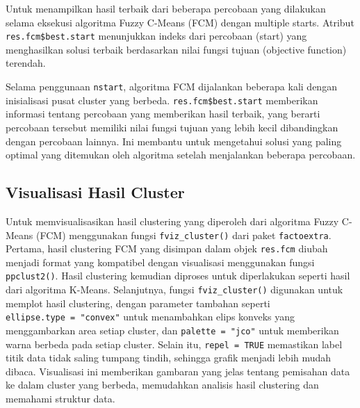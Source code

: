 \documentclass[
  oneside]{book}
\newenvironment{Shaded}{\begin{snugshade}}{\end{snugshade}}
\newcommand{\CommentTok}[1]{\textcolor[rgb]{0.56,0.35,0.01}{\textit{#1}}}
\newcommand{\NormalTok}[1]{#1}
\newcommand{\SpecialCharTok}[1]{\textcolor[rgb]{0.81,0.36,0.00}{\textbf{#1}}}
\begin{document}
Untuk menampilkan hasil terbaik dari beberapa percobaan yang dilakukan selama eksekusi algoritma Fuzzy C-Means (FCM) dengan multiple starts. Atribut \texttt{res.fcm\$best.start} menunjukkan indeks dari percobaan (start) yang menghasilkan solusi terbaik berdasarkan nilai fungsi tujuan (objective function) terendah.

Selama penggunaan \texttt{nstart}, algoritma FCM dijalankan beberapa kali dengan inisialisasi pusat cluster yang berbeda. \texttt{res.fcm\$best.start} memberikan informasi tentang percobaan yang memberikan hasil terbaik, yang berarti percobaan tersebut memiliki nilai fungsi tujuan yang lebih kecil dibandingkan dengan percobaan lainnya. Ini membantu untuk mengetahui solusi yang paling optimal yang ditemukan oleh algoritma setelah menjalankan beberapa percobaan.

\begin{Shaded}
\end{Shaded}

\subsection*{Visualisasi Hasil Cluster}\label{visualisasi-hasil-cluster-1}

Untuk memvisualisasikan hasil clustering yang diperoleh dari algoritma Fuzzy C-Means (FCM) menggunakan fungsi \texttt{fviz\_cluster()} dari paket \texttt{factoextra}. Pertama, hasil clustering FCM yang disimpan dalam objek \texttt{res.fcm} diubah menjadi format yang kompatibel dengan visualisasi menggunakan fungsi \texttt{ppclust2()}. Hasil clustering kemudian diproses untuk diperlakukan seperti hasil dari algoritma K-Means. Selanjutnya, fungsi \texttt{fviz\_cluster()} digunakan untuk memplot hasil clustering, dengan parameter tambahan seperti \texttt{ellipse.type\ =\ "convex"} untuk menambahkan elips konveks yang menggambarkan area setiap cluster, dan \texttt{palette\ =\ "jco"} untuk memberikan warna berbeda pada setiap cluster. Selain itu, \texttt{repel\ =\ TRUE} memastikan label titik data tidak saling tumpang tindih, sehingga grafik menjadi lebih mudah dibaca. Visualisasi ini memberikan gambaran yang jelas tentang pemisahan data ke dalam cluster yang berbeda, memudahkan analisis hasil clustering dan memahami struktur data.
\end{document}
